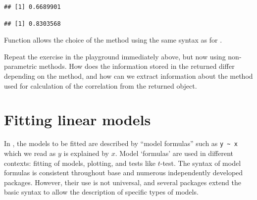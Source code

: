 \documentclass[krantz2]{krantz}\usepackage{knitr}%
\begin{document}
\begin{knitrout}\footnotesize
{}\color{fgcolor}\begin{kframe}
\begin{alltt}
\hlstd{(} \hlopt{$}  \hlopt{$}  \hlstd{=} \hlstd{)}
\end{alltt}
\begin{verbatim}
## [1] 0.6689901
\end{verbatim}
\begin{alltt}
\hlstd{(} \hlopt{$}  \hlopt{$}  \hlstd{=} \hlstd{)}
\end{alltt}
\begin{verbatim}
## [1] 0.8303568
\end{verbatim}
\end{kframe}
\end{knitrout}

Function  allows the choice of the method using the same syntax as for .

\begin{playground}
Repeat the exercise in the playground immediately above, but now using non-parametric methods. How does the information stored in the returned  differ depending on the method, and how can we extract information about the method used for calculation of the correlation from the returned object.
\end{playground}

\section{Fitting linear models}\label{sec:stat:LM}

In \Rlang, the models to be fitted are described by ``model formulas'' such as \verb|y ~ x| which we read as $y$ is explained by $x$. Model `formulas' are used in different contexts: fitting of models, plotting, and tests like $t$-test. The syntax of model formulas is consistent throughout base \Rlang and numerous independently developed packages. However, their use is not universal, and several packages extend the basic syntax to allow the description of specific types of models.
\end{document}
